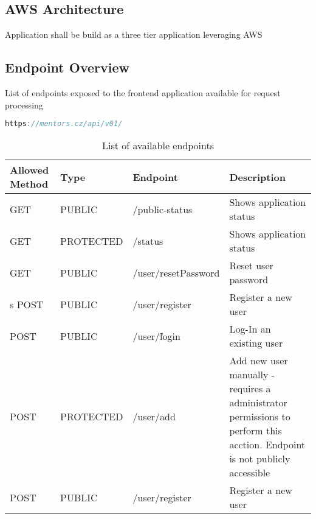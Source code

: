 \documentclass{article}
\begin{document}
\subsection{AWS Architecture}
Application shall be build as a three tier application leveraging AWS

\subsection{Endpoint Overview}
List of endpoints exposed to the frontend application available for request processing

\begin{lstlisting}[language=Java, caption=Backend Application base path]
        https://mentors.cz/api/v01/
\end{lstlisting}

\begin{table}[ht]
    \centering
    \begin{tabular}{|L{2cm}|L{2cm}|L{6cm}|L{6cm}|}
        \hline
        Allowed Method&Type&Endpoint&Description \\ \hline
        GET&PUBLIC&/public-status&Shows application status \\ \hline

        GET&PROTECTED&/status&Shows application status \\ \hline
        GET&PUBLIC&/user/resetPassword&Reset user password \\ \hline
s
        POST&PUBLIC&/user/register&Register a new user  \\ \hline
        POST&PUBLIC&/user/ľogin&Log-In an existing user \\ \hline
        POST&PROTECTED&/user/add&Add new user manually - requires a administrator permissions to perform this acction. Endpoint is not publicly accessible  \\ \hline
        POST&PUBLIC&/user/register&Register a new user  \\ \hline

    \end{tabular}
    \caption{List of available endpoints}
\end{table}
\end{document}
